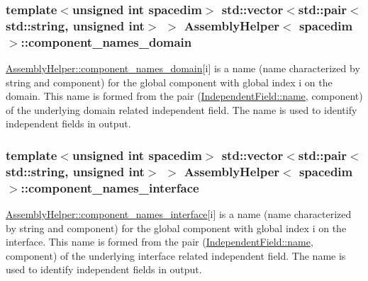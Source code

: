 \subsubsection[{\texorpdfstring{component\+\_\+names\+\_\+domain}{component_names_domain}}]{\setlength{\rightskip}{0pt plus 5cm}template$<$unsigned int spacedim$>$ std\+::vector$<$std\+::pair$<$std\+::string, unsigned int$>$ $>$ {\bf Assembly\+Helper}$<$ spacedim $>$\+::component\+\_\+names\+\_\+domain\hspace{0.3cm}{\ttfamily [private]}}\hypertarget{class_assembly_helper_af5e29448f133863a1859be8bfbb300c6}{}\label{class_assembly_helper_af5e29448f133863a1859be8bfbb300c6}
\hyperlink{class_assembly_helper_af5e29448f133863a1859be8bfbb300c6}{Assembly\+Helper\+::component\+\_\+names\+\_\+domain}\mbox{[}{\ttfamily i}\mbox{]} is a name (name characterized by string and component) for the global component with global index {\ttfamily i} on the domain. This name is formed from the pair (\hyperlink{class_independent_field_ae05f8565e4ce1a70b5b833555dc084b5}{Independent\+Field\+::name}, {\ttfamily component}) of the underlying domain related independent field. The name is used to identify independent fields in output. 
\subsubsection[{\texorpdfstring{component\+\_\+names\+\_\+interface}{component_names_interface}}]{\setlength{\rightskip}{0pt plus 5cm}template$<$unsigned int spacedim$>$ std\+::vector$<$std\+::pair$<$std\+::string, unsigned int$>$ $>$ {\bf Assembly\+Helper}$<$ spacedim $>$\+::component\+\_\+names\+\_\+interface\hspace{0.3cm}{\ttfamily [private]}}\hypertarget{class_assembly_helper_a7ae6ae2ec356cbb7b830d968315d280c}{}\label{class_assembly_helper_a7ae6ae2ec356cbb7b830d968315d280c}
\hyperlink{class_assembly_helper_a7ae6ae2ec356cbb7b830d968315d280c}{Assembly\+Helper\+::component\+\_\+names\+\_\+interface}\mbox{[}{\ttfamily i}\mbox{]} is a name (name characterized by string and component) for the global component with global index {\ttfamily i} on the interface. This name is formed from the pair (\hyperlink{class_independent_field_ae05f8565e4ce1a70b5b833555dc084b5}{Independent\+Field\+::name}, {\ttfamily component}) of the underlying interface related independent field. The name is used to identify independent fields in output. 
